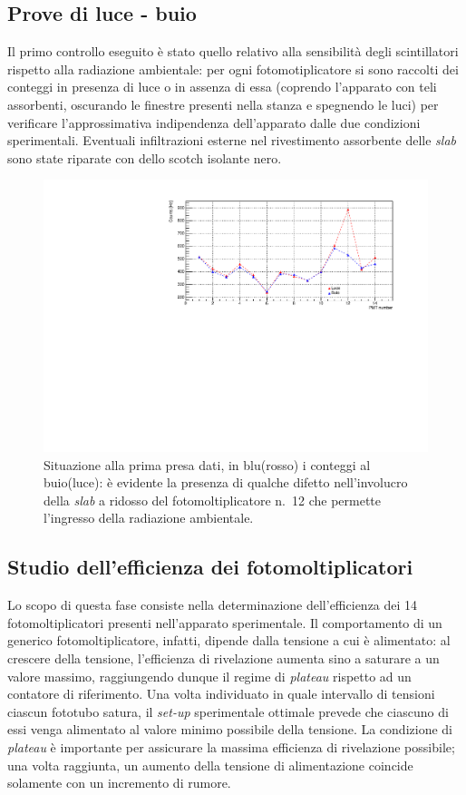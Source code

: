 \documentclass[10pt, oneside, a4paper]{article}   	%
\begin{document}
\subsection{Prove di luce - buio}
Il primo controllo eseguito è stato quello relativo alla sensibilità degli scintillatori rispetto alla radiazione ambientale: per ogni fotomotiplicatore si sono raccolti dei conteggi in presenza di luce o in assenza di essa (coprendo l'apparato con teli assorbenti, oscurando le finestre presenti nella stanza e spegnendo le luci) per verificare l'approssimativa indipendenza dell'apparato dalle due condizioni sperimentali. Eventuali infiltrazioni esterne nel rivestimento assorbente delle \emph{slab} sono state riparate con dello scotch isolante nero. 
%
\begin{figure}[h]
	\centering
	\includegraphics[scale=0.6]{img/luce_buio_100s.pdf}
	\caption{Situazione alla prima presa dati, in blu(rosso) i conteggi al buio(luce): è evidente la presenza di qualche difetto nell'involucro della \emph{slab} a ridosso del fotomoltiplicatore n.~12 che permette l'ingresso della radiazione ambientale.}
\end{figure}
%
\subsection{Studio dell'efficienza dei fotomoltiplicatori}
Lo scopo di questa fase consiste nella determinazione dell'efficienza dei 14 fotomoltiplicatori presenti nell'apparato sperimentale. Il comportamento di un generico fotomoltiplicatore, infatti, dipende dalla tensione a cui è alimentato: al crescere della tensione, l'efficienza di rivelazione aumenta sino a saturare a un valore massimo, raggiungendo dunque il regime di \textit{plateau} rispetto ad un contatore di riferimento.
Una volta individuato in quale intervallo di tensioni ciascun fototubo satura, il \emph{set-up} sperimentale ottimale prevede che ciascuno di essi venga alimentato al valore minimo possibile della tensione. 
La condizione di \textit{plateau} è importante per assicurare la massima efficienza di rivelazione possibile; una volta raggiunta, un aumento della tensione di alimentazione coincide solamente con un incremento di rumore.  
\end{document}

